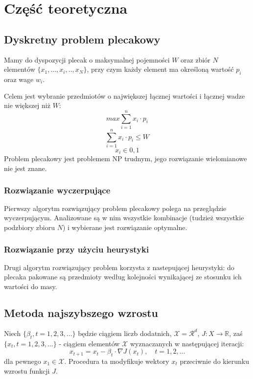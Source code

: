 
    \section{Część teoretyczna}
    \subsection{Dyskretny problem plecakowy}
    Mamy do dyspozycji plecak o maksymalnej pojemności $W$ oraz zbiór $N$ 
    elementów $\{x_1, ..., x_i, .., x_N\}$, przy czym każdy element ma określoną 
    wartość $p_i$ oraz wage $w_i$. 

    Celem jest wybranie przedmiotów o największej łącznej wartości i łącznej 
    wadze nie większej niż $W$:
    \[
    max \sum_{i=1}^{n} x_i \cdot p_i 
    \]
    \[
      \sum_{i=1}^{n} x_i \cdot p_i \leq W
    \]
    \[
      x_i \in {0,1}
    \]
    Problem plecakowy jest problemem NP trudnym, jego rozwiązanie wielomianowe
    nie jest znane. 

    \subsubsection{Rozwiązanie wyczerpujące}
    Pierwszy algorytm rozwiązujący problem plecakowy polega na przeglądzie 
    wyczerpującym. Analizowane są w nim wszystkie kombinacje (tudzież
    wszystkie podzbiory zbioru $N$) i wybierane jest rozwiązanie optymalne.
    \subsubsection{Rozwiązanie przy użyciu heurystyki}
    Drugi algorytm rozwiązujący problem korzysta z nastepującej heurystyki:
    do plecaka pakowane są przedmioty według kolejności wynikającej ze stosunku
    ich wartości do masy.

    \subsection{Metoda najszybszego wzrostu}
    Niech $\{\beta_t, t = 1,2,3,...\}$ będzie ciągiem liczb dodatnich, $\mathcal{X} = \mathcal{R}^d$, $J: X \rightarrow \mathbb{R}$, zaś $\{x_t, t = 1,2,3,...\}$ - ciągiem elementów $\mathcal{X}$ wyznaczanych w następującej iteracji:
    \[
      x_{t+1} = x_t - \beta_t \cdot \nabla J(x_t), \quad t = 1,2,...
    \]
    dla pewnego $x_1 \in \mathcal{X}$. Procedura ta modyfikuje wektory $x_t$ przeciwnie 
    do kierunku wzrostu funkcji $J$.


